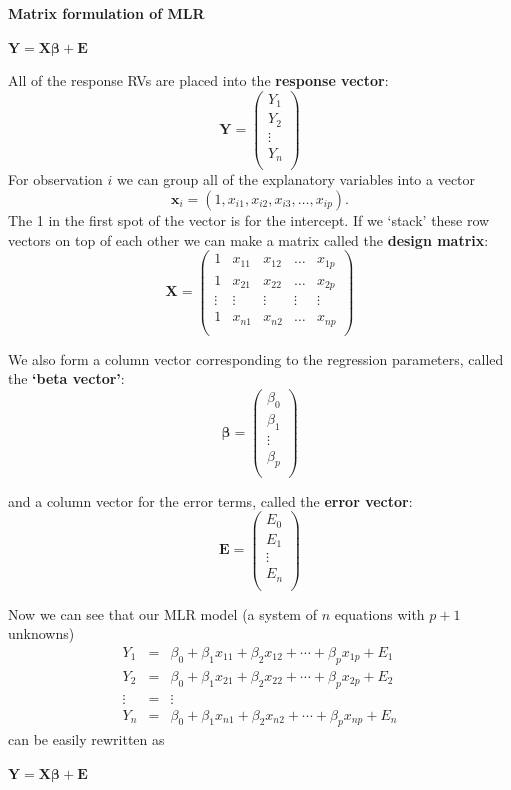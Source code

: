\textbf{Matrix formulation of MLR}\\
\begin{center}
$\textbf{Y} = \textbf{X}\boldsymbol{\beta} + \textbf{E}$
\end{center}
All of the response RVs are placed into the \textbf{response vector}:
$$\textbf{Y}=\left(\begin{array}{c}
Y_1\\
Y_2\\
\vdots\\
Y_n\\
\end{array}\right)$$
For observation $i$ we can group all of the explanatory variables into a vector
$$\textbf{x}_{i} = (1,x_{i1},x_{i2},x_{i3},\ldots,x_{ip}).$$
The 1 in the first spot of the vector is for the intercept.  If we `stack' these row vectors on top of each other we can make a matrix called the \textbf{design matrix}:
$$
\textbf{X}=\left(\begin{array}{ccccc}
1  &  x_{11}  &   x_{12} & \ldots & x_{1p} \\
1  &  x_{21}  &   x_{22} & \ldots & x_{2p} \\
\vdots &\vdots &\vdots &\vdots &\vdots \\ 
1  &  x_{n1}  &   x_{n2} & \ldots & x_{np} \\
\end{array}\right)$$

We also form a column vector corresponding to the regression parameters, called the \textbf{`beta vector'}:
$$\boldsymbol{\beta}=\left(\begin{array}{c}
\beta_0\\
\beta_1\\
\vdots\\
\beta_p\\
\end{array}\right)$$

and a column vector for the error terms, called the \textbf{error vector}:
$$\textbf{E}=\left(\begin{array}{c}
E_0\\
E_1\\
\vdots\\
E_n\\
\end{array}\right)$$


Now we can see that our MLR model (a system of $n$ equations with $p+1$ unknowns) 
\begin{eqnarray*}
Y_1 & = & \beta_0 + \beta_1 x_{11} + \beta_2 x_{12}+ \cdots + \beta_p x_{1p} + E_1 \\
Y_2 & = & \beta_0 + \beta_1 x_{21} + \beta_2 x_{22}+ \cdots + \beta_p x_{2p} + E_2 \\
\vdots & = & \vdots \\
Y_n & = & \beta_0 + \beta_1 x_{n1} + \beta_2 x_{n2}+ \cdots + \beta_p x_{np} + E_n
\end{eqnarray*}
can be easily rewritten as
\begin{center}
$\textbf{Y} = \textbf{X}\boldsymbol{\beta} + \textbf{E}$
\end{center}

